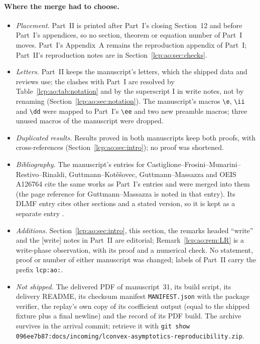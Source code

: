 \documentclass[11pt]{article}
\numberwithin{equation}{section}
\theoremstyle{definition}\newtheorem{definition}[theorem]{Definition}
\theoremstyle{remark}\newtheorem{remark}[theorem]{Remark}
\newcommand{\ee}{\mathrm e}
\newcommand{\ii}{\mathrm i}%
\newcommand{\dd}{\mathrm d}%
\begin{document}
\paragraph{Where the merge had to choose.}
\begin{itemize}[leftmargin=*,itemsep=0.15em]
\item \emph{Placement.} Part~II is printed after Part~I's closing
 Section~12 and before Part~I's appendices, so no section, theorem or
 equation number of Part~I moves. Part~I's Appendix~A remains the
 reproduction appendix of Part~I; Part~II's reproduction notes are in
 Section~\ref{lcp:ao:sec:checks}.
\item \emph{Letters.} Part~II keeps the manuscript's letters, which the
 shipped data and reviews use; the clashes with Part~I are resolved by
 Table~\ref{lcp:ao:tab:notation} and by the superscript $\mathrm I$ in
 write notes, not by renaming (Section~\ref{lcp:ao:sec:notation}). The
 manuscript's macros \verb|\e|, \verb|\ii| and \verb|\dd| were mapped to
 Part~I's \verb|\ee| and two new preamble macros; three unused macros of the
 manuscript were dropped.
\item \emph{Duplicated results.} Results proved in both manuscripts keep
 both proofs, with cross-references (Section~\ref{lcp:ao:sec:intro}); no
 proof was shortened.
\item \emph{Bibliography.} The manuscript's entries for
 Castiglione--Frosini--Munarini--Restivo--Rinaldi, Guttmann--Kot\v e\v
 sovec, Guttmann--Massazza and OEIS A126764 cite the same works as Part~I's
 entries \cite{castiglione,gk,zconvex,oeis} and were merged into them (the
 page reference for Guttmann--Massazza is noted in that entry). Its DLMF
 entry cites other sections and a stated version, so it is kept as a
 separate entry \cite{lcp-ao-dlmf}.
\item \emph{Additions.} Section~\ref{lcp:ao:sec:intro}, this section, the
 remarks headed ``write'' and the \textsf{[write]} notes in Part~II are
 editorial; Remark~\ref{lcp:ao:rem:LR} is a write-phase observation, with
 its proof and a numerical check. No statement, proof or number of either
 manuscript was changed; labels of Part~II carry the prefix
 \texttt{lcp:ao:}.
\item \emph{Not shipped.} The delivered PDF of manuscript~31, its build
 script, its delivery README, its checksum manifest
 \texttt{MANIFEST.json} with the package verifier, the replay's own copy of
 its coefficient output (equal to the shipped fixture plus a final
 newline) and the record of its PDF build. The archive survives in the
 arrival commit; retrieve it with \texttt{git show
 096ee7b87:\allowbreak docs/\allowbreak incoming/\allowbreak lconvex-\allowbreak asymptotics-\allowbreak reproducibility.zip}.
\end{itemize}
\end{document}
